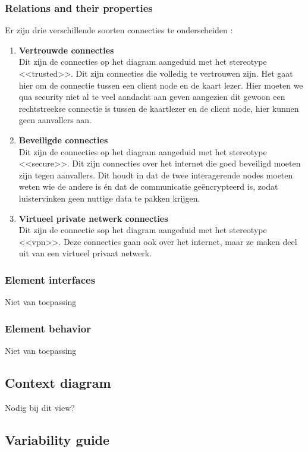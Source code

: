 \documentclass[a4paper,10pt]{book}
\begin{document}
\subsubsection{Relations and their properties}
Er zijn drie verschillende soorten connecties te onderscheiden : 
\begin{enumerate}
 \item \textbf{Vertrouwde connecties}\\
Dit zijn de connecties op het diagram aangeduid met het stereotype <<trusted>>. Dit zijn
connecties die volledig te vertrouwen zijn. Het gaat hier om de connectie tussen een client
node en de kaart lezer. Hier moeten we qua security niet al te veel aandacht aan geven
aangezien dit gewoon een rechtstreekse connectie is tussen de kaartlezer en de client node,
hier kunnen geen aanvallers aan.
\item \textbf{Beveiligde connecties}\\
Dit zijn de connecties op het diagram aangeduid met het stereotype <<secure>>. Dit zijn
connecties over het internet die goed beveiligd moeten zijn tegen aanvallers. Dit houdt
in dat de twee interagerende nodes moeten weten wie de andere is én dat de communicatie
geëncrypteerd is, zodat luistervinken geen nuttige data te pakken krijgen.
\item \textbf{Virtueel private netwerk connecties}\\
Dit zijn de connectie sop het diagram aangeduid met het stereotype <<vpn>>. Deze connecties
gaan ook over het internet, maar ze maken deel uit van een virtueel privaat netwerk.
\end{enumerate}

\subsubsection{Element interfaces}

Niet van toepassing

\subsubsection{Element behavior}

Niet van toepassing

\subsection{Context diagram}

Nodig bij dit view?

\subsection{Variability guide}
\end{document}
